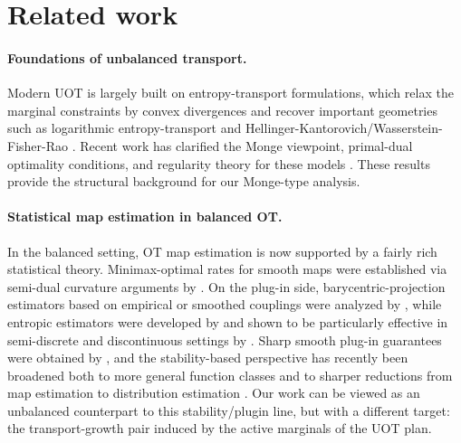 \documentclass[11pt,reqno]{amsart}
\theoremstyle{definition}
\begin{document}
\section{Related work}

\paragraph{Foundations of unbalanced transport.}
Modern UOT is largely built on entropy-transport formulations, which relax the marginal constraints by convex divergences and recover important geometries such as logarithmic entropy-transport and Hellinger-Kantorovich/Wasserstein-Fisher-Rao \cite{ChizatEtAl2018,LieroMielkeSavare2018}. Recent work has clarified the Monge viewpoint, primal-dual optimality conditions, and regularity theory for these models \cite{savare2024relaxation,gallouet2025regularity}. These results provide the structural background for our Monge-type analysis.

\paragraph{Statistical map estimation in balanced OT.}
In the balanced setting, OT map estimation is now supported by a fairly rich statistical theory. Minimax-optimal rates for smooth maps were established via semi-dual curvature arguments by \cite{hutter2021minimax}. On the plug-in side, barycentric-projection estimators based on empirical or smoothed couplings were analyzed by \cite{deb2021barycentric}, while entropic estimators were developed by \cite{Pooladian2021} and shown to be particularly effective in semi-discrete and discontinuous settings by \cite{pooladian2023semidiscrete}. Sharp smooth plug-in guarantees were obtained by \cite{manole2024plugin}, and the stability-based perspective has recently been broadened both to more general function classes and to sharper reductions from map estimation to distribution estimation \cite{divol2025general,balakrishnan2025stability,ponnoprat2025minimax}. Our work can be viewed as an unbalanced counterpart to this stability/plugin line, but with a different target: the transport-growth pair induced by the active marginals of the UOT plan.
\end{document}

